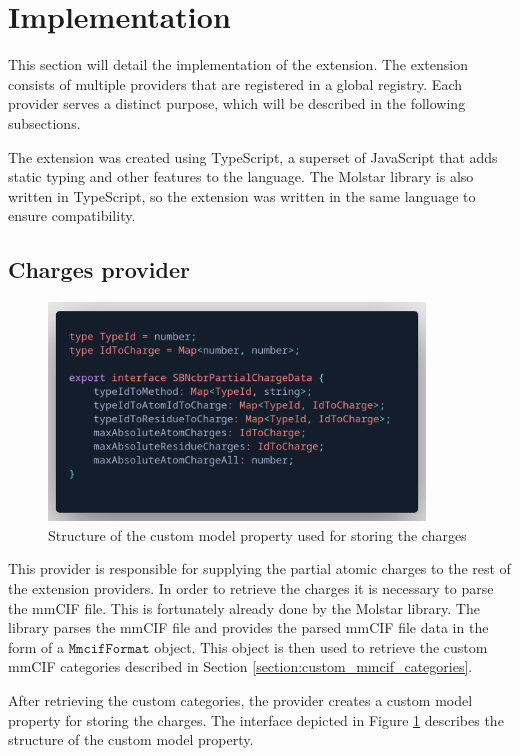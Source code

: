\documentclass[
  digital,     %
  oneside,     %
  nosansbold,  %
  nocolorbold, %
  lof,         %
  lot,         %
]{fithesis4}
\begin{document}
\section{Implementation}

This section will detail the implementation of the extension. The extension consists of multiple providers that are registered in a global registry. Each provider serves a distinct purpose, which will be described in the following subsections.

The extension was created using TypeScript, a superset of JavaScript that adds static typing and other features to the language. The Molstar library is also written in TypeScript, so the extension was written in the same language to ensure compatibility.

\subsection{Charges provider}

\begin{figure}
  \begin{center}
    \includegraphics[width=10cm]{figures/charge_data_structure.png}
  \end{center}
  \caption{Structure of the custom model property used for storing the charges}
  \label{figure:charge_data_structure}
\end{figure}

This provider is responsible for supplying the partial atomic charges to the rest of the extension providers.
In order to retrieve the charges it is necessary to parse the mmCIF file.
This is fortunately already done by the Molstar library.
The library parses the mmCIF file and provides the parsed mmCIF file data in the form of a $\texttt{MmcifFormat}$ object.
This object is then used to retrieve the custom mmCIF categories described in Section \ref{section:custom_mmcif_categories}.

After retrieving the custom categories, the provider creates a custom model property for storing the charges. The interface depicted in Figure \ref{figure:charge_data_structure} describes the structure of the custom model property.
\end{document}
